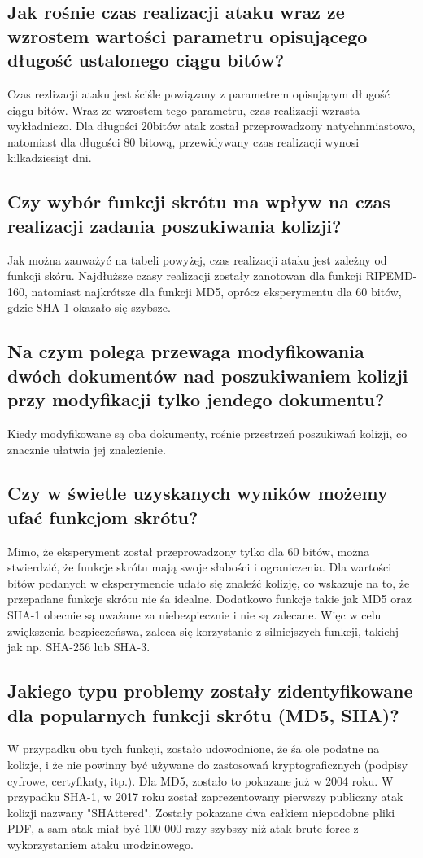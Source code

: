 \documentclass{article}
\begin{document}
\subsection{Jak rośnie czas realizacji ataku wraz ze wzrostem wartości parametru opisującego długość ustalonego ciągu bitów?}
Czas rezlizacji ataku jest ściśle powiązany z parametrem opisującym długość ciągu bitów. Wraz ze wzrostem tego parametru,
czas realizacji wzrasta wykładniczo. Dla długości 20bitów atak został przeprowadzony natychnmiastowo, natomiast dla długości 80 bitową, przewidywany czas realizacji wynosi kilkadziesiąt dni.
\subsection{Czy wybór funkcji skrótu ma wpływ na czas realizacji zadania poszukiwania kolizji?}
Jak można zauważyć na tabeli powyżej, czas realizacji ataku jest zależny od funkcji skóru. Najdłuższe czasy realizacji
zostały zanotowan dla funkcji RIPEMD-160, natomiast najkrótsze dla funkcji MD5, oprócz eksperymentu dla 60 bitów, gdzie SHA-1 okazało się szybsze.
\subsection{Na czym polega przewaga modyfikowania dwóch dokumentów nad poszukiwaniem kolizji przy modyfikacji tylko jendego dokumentu?}
Kiedy modyfikowane są oba dokumenty, rośnie przestrzeń poszukiwań kolizji, co znacznie ułatwia jej znalezienie.
\subsection{Czy w świetle uzyskanych wyników możemy ufać funkcjom skrótu?}
Mimo, że eksperyment został przeprowadzony tylko dla 60 bitów, można stwierdzić, że funkcje skrótu mają swoje słabości i ograniczenia. Dla wartości bitów podanych w eksperymencie
udało się znaleźć kolizję, co wskazuje na to, że przepadane funkcje skrótu nie śa idealne. Dodatkowo funkcje takie jak MD5 oraz SHA-1 obecnie są uważane za niebezpiecznie i nie są zalecane.
Więc w celu zwiększenia bezpieczeńswa, zaleca się korzystanie z silniejszych funkcji, takichj jak np. SHA-256 lub SHA-3.
\subsection{Jakiego typu problemy zostały zidentyfikowane dla popularnych funkcji skrótu (MD5, SHA)?}
W przypadku obu tych funkcji, zostało udowodnione, że śa ole podatne na kolizje, i że nie powinny być używane
do zastosowań kryptograficznych (podpisy cyfrowe, certyfikaty, itp.). Dla MD5, zostało to pokazane już w 2004 roku. W przypadku SHA-1, w 2017 roku został
zaprezentowany pierwszy publiczny atak kolizji nazwany "SHAttered". Zostały pokazane dwa całkiem niepodobne pliki PDF, a sam atak miał być 100 000 razy szybszy
niż atak brute-force z wykorzystaniem ataku urodzinowego.
\end{document}
